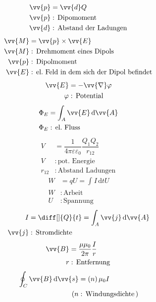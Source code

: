 \documentclass[a4paper,12pt]{article}
\newcommand{\td}{\,\text{d}}
\numberwithin{equation}{section}
\begin{document}
\begin{align} 
        \vv{p}&=\vv{d}Q\\
        \vv{p}&:\,\text{Dipomoment}\,\nonumber \\
        \vv{d}&:\,\text{Abstand der Ladungen}\,\nonumber 
\end{align} 
\begin{align} 
        \vv{M}&=\vv{p}\times \vv{E}\\
        \vv{M}&:\,\text{Drehmoment eines Dipols}\,\nonumber \\
        \vv{p}&:\,\text{Dipolmoment}\,\nonumber \\
        \vv{E}&:\,\text{el.\ Feld in dem sich der Dipol befindet}\,\nonumber 
\end{align} 
\begin{align} 
        \vv{E}&=-\vv{\nabla }\varphi \\
        \varphi &:\,\text{Potential}\,\nonumber 
\end{align} 
\begin{align} 
        \Phi _E&=\int_{A}^{}\vv{E}\td \vv{A}\\
        \Phi _E&:\,\text{el.\ Fluss}\,\nonumber 
\end{align} 
\begin{align} 
        V&=\dfrac{1}{4\pi \varepsilon \varepsilon _0}\dfrac{Q_1Q_2}{r_{12}}\\
        V&:\,\text{pot.\ Energie}\,\nonumber \\
        r_{12}&:\,\text{Abstand Ladungen}\,\nonumber 
\end{align} 
\begin{align} 
        W&=qU=\int_{}^{}I\td tU\\
        W&:\,\text{Arbeit}\,\nonumber \\
        U&:\,\text{Spannung}\,\nonumber 
\end{align} 
\begin{align} 
        I&=\diff[]{Q}{t}=\int_{A}^{}\vv{j}\td \vv{A}\\
        \vv{j}&:\,\text{Stromdichte}\,\nonumber 
\end{align} 
\begin{align} 
        \vv{B}&=\dfrac{\mu \mu _0}{2\pi }\dfrac{I}{r}\\
        r&:\,\text{Entfernung}\,\nonumber 
\end{align} 
\begin{align} 
        \oint_{C}^{}\vv{B}\td \vv{s}&=\left(n\right)\mu _0I\\
        (n&:\,\text{Windungsdichte}\,)\nonumber 
\end{align} 
\end{document}

